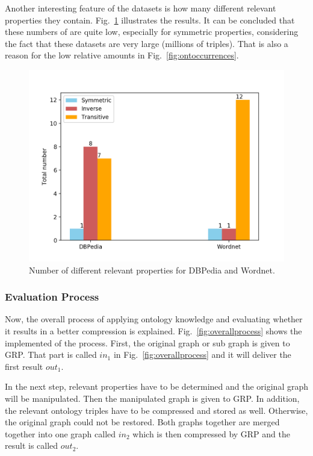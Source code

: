 Another interesting feature of the datasets is how many different relevant properties they contain. Fig.~\ref{fig:totalnumbers} illustrates the results. It can be concluded that these numbers of are quite low, especially for symmetric properties, considering the fact that these datasets are very large (millions of triples). That is also a reason for the low relative amounts in Fig.~\ref{fig:ontoccurrences}.

\begin{figure}
	\centering
	\includegraphics[width=0.8\linewidth]{figures/4_evaluation/ontology/totalNumbers}
	\caption{Number of different relevant properties for DBPedia and Wordnet.}
	\label{fig:totalnumbers}
\end{figure}



\subsubsection{Evaluation Process}
Now, the overall process of applying ontology knowledge and evaluating whether it results in a better compression is explained. Fig.~\ref{fig:overallprocess} shows the implemented of the process. First, the original graph or sub graph is given to GRP. That part is called $in_1$ in Fig.~\ref{fig:overallprocess} and it will deliver the first result $out_1$.

In the next step, relevant properties have to be determined and the original graph will be manipulated. Then the manipulated graph is given to GRP. In addition, the relevant ontology triples have to be compressed and stored as well. Otherwise, the original graph could not be restored. Both graphs together are merged together into one graph called $in_2$ which is then compressed by GRP and the result is called $out_2$. 


